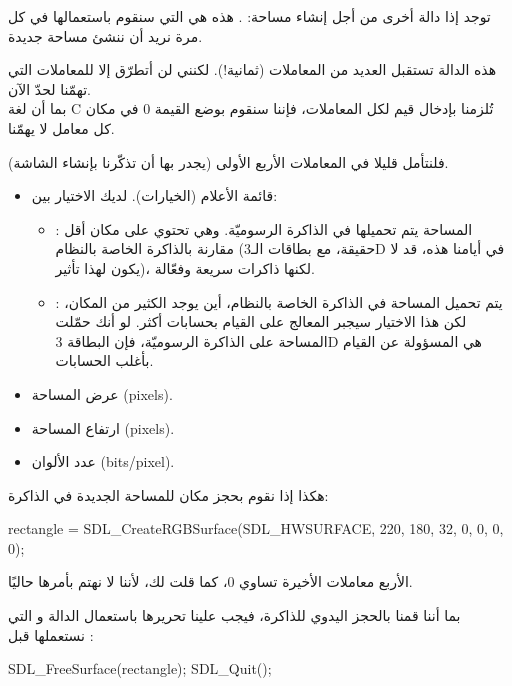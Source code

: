 توجد إذا دالة أخرى من أجل إنشاء مساحة: 
.
هذه هي التي سنقوم باستعمالها في كل مرة نريد أن ننشئ مساحة جديدة.

هذه الدالة تستقبل العديد من المعاملات (ثمانية!). لكنني لن أتطرّق إلا للمعاملات التي تهمّنا لحدّ الآن.\\
بما أن لغة 
\textenglish{C}
تُلزمنا بإدخال قيم لكل المعاملات، فإننا سنقوم بوضع القيمة 0 في مكان كل معامل لا يهمّنا.

فلنتأمل قليلا في المعاملات الأربع الأولى (يجدر بها أن تذكّرنا بإنشاء الشاشة).

\begin{itemize}
	\item قائمة الأعلام (الخيارات). لديك الاختيار بين:
	\begin{itemize}
		\item {}:
		المساحة يتم تحميلها في الذاكرة الرسوميّة. وهي تحتوي على مكان أقل مقارنة بالذاكرة الخاصة بالنظام (حقيقة، مع بطاقات الـ\textenglish{3D}
		في أيامنا هذه، قد لا يكون لهذا تأثير)، لكنها ذاكرات سريعة وفعّالة.
		\item {}:
		يتم تحميل المساحة في الذاكرة الخاصة بالنظام، أين يوجد الكثير من المكان، لكن هذا الاختيار سيجبر المعالج على القيام بحسابات أكثر. لو أنك حمّلت المساحة على الذاكرة الرسوميّة، فإن البطاقة 
		\textenglish{3D}
		هي المسؤولة عن القيام بأغلب الحسابات.
	\end{itemize}
	\item عرض المساحة (\textenglish{pixels}).
	\item ارتفاع المساحة (\textenglish{pixels}).
	\item عدد الألوان (\textenglish{bits/pixel}).
\end{itemize}

هكذا إذا نقوم بحجز مكان للمساحة الجديدة في الذاكرة:

\begin{Csource}
rectangle = SDL_CreateRGBSurface(SDL_HWSURFACE, 220, 180, 32, 0, 0, 0, 0);
\end{Csource}

الأربع معاملات الأخيرة تساوي 0، كما قلت لك، لأننا لا نهتم بأمرها حاليًا. 

بما أننا قمنا بالحجز اليدوي للذاكرة، فيجب علينا تحريرها باستعمال الدالة 
و التي نستعملها قبل 
:

\begin{Csource}
SDL_FreeSurface(rectangle);
SDL_Quit();
\end{Csource}

